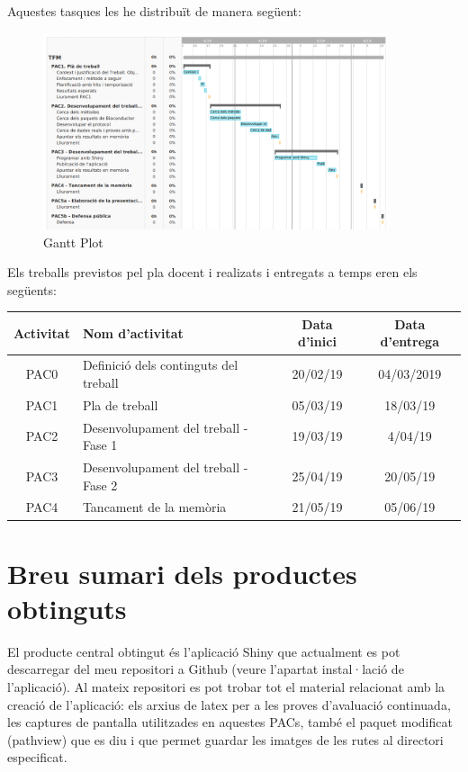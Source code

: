 Aquestes tasques les he distribuït de manera següent: 

\begin{figure}[H]
\caption{Gantt Plot}
\centering
\includegraphics[width=0.9\textwidth]{figures/GanttPlot}
\end{figure}

Els treballs previstos pel pla docent i realizats i entregats a temps eren els següents: 

\begin{center}
\begin{tabular}{||c | l | c | c||} 
\hline
Activitat & Nom d'activitat & Data d'inici & Data d'entrega \\ [0.5ex] 
\hline\hline
PAC0 & Definició dels continguts del treball & 20/02/19 & 04/03/2019 \\ 
\hline
PAC1 & Pla de treball & 05/03/19 & 18/03/19 \\
\hline
PAC2 & Desenvolupament del treball - Fase 1 & 19/03/19 & 4/04/19 \\
\hline
PAC3 & Desenvolupament del treball - Fase 2 & 25/04/19 & 20/05/19 \\
\hline
PAC4 & Tancament de la memòria & 21/05/19 & 05/06/19 \\
\hline
\end{tabular}
\end{center}

\section{Breu sumari dels productes obtinguts}

El producte central obtingut és l'aplicació Shiny que actualment es pot descarregar del meu repositori a Github (veure l'apartat instal·lació de l'aplicació). Al mateix repositori es pot trobar tot el material relacionat amb la creació de l'aplicació: els arxius de latex per a les proves d'avaluació continuada, les captures de pantalla utilitzades en aquestes PACs, també el paquet modificat \helvetica(pathview) que es diu  i que permet guardar les imatges de les rutes al directori especificat.

